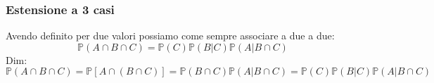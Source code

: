 \subsubsection{Estensione a 3 casi}
Avendo definito per due valori possiamo come sempre associare a due a due:
$$ \mathbb{P}(A \cap B \cap C) = \mathbb{P}(C) \mathbb{P}(B|C) \mathbb{P}(A| B \cap C) $$
Dim:
$$ \mathbb{P}(A \cap B \cap C) = \mathbb{P}[A \cap (B \cap C)] = \mathbb{P}(B \cap C) \mathbb{P}(A| B \cap C) = \mathbb{P}(C) \mathbb{P}(B|C) \mathbb{P}(A| B \cap C) $$

